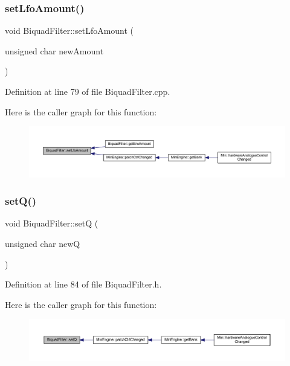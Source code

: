 \subsubsection{\texorpdfstring{set\+Lfo\+Amount()}{setLfoAmount()}}
{\footnotesize\ttfamily void Biquad\+Filter\+::set\+Lfo\+Amount (\begin{DoxyParamCaption}\item[{unsigned char}]{new\+Amount }\end{DoxyParamCaption})}



Definition at line 79 of file Biquad\+Filter.\+cpp.

Here is the caller graph for this function\+:
\nopagebreak
\begin{figure}[H]
\begin{center}
\leavevmode
\includegraphics[width=350pt]{d9/d6f/class_biquad_filter_a57c5069dadf75d44783a2fb20dadfbc4_icgraph}
\end{center}
\end{figure}
\mbox{\label{class_biquad_filter_adc19385e7684fe4660b4d1f2e433fa00}} 
\subsubsection{\texorpdfstring{set\+Q()}{setQ()}}
{\footnotesize\ttfamily void Biquad\+Filter\+::setQ (\begin{DoxyParamCaption}\item[{unsigned char}]{newQ }\end{DoxyParamCaption})\hspace{0.3cm}{\ttfamily [inline]}}



Definition at line 84 of file Biquad\+Filter.\+h.

Here is the caller graph for this function\+:
\nopagebreak
\begin{figure}[H]
\begin{center}
\leavevmode
\includegraphics[width=350pt]{d9/d6f/class_biquad_filter_adc19385e7684fe4660b4d1f2e433fa00_icgraph}
\end{center}
\end{figure}
\mbox{\label{class_biquad_filter_af31a36e9f121facbabf87d303642d4e2}} 
